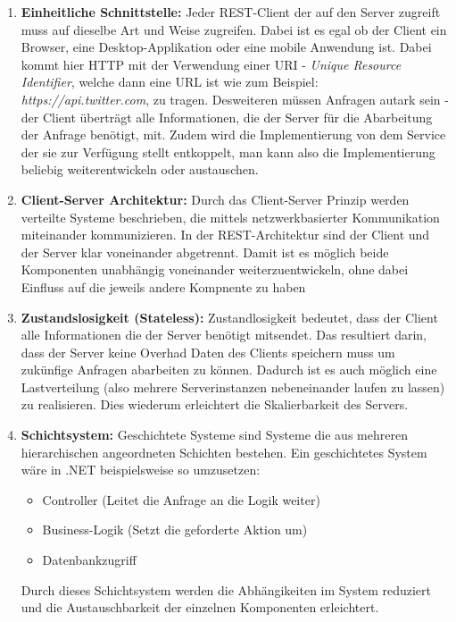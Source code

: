 \begin{enumerate}
    \item \textbf{Einheitliche Schnittstelle: }
    Jeder REST-Client der auf den Server zugreift muss auf dieselbe Art und Weise zugreifen.
    Dabei ist es egal ob der Client ein Browser, eine Desktop-Applikation oder eine mobile Anwendung ist.
    Dabei kommt hier HTTP mit der Verwendung einer URI - \textit{Unique Resource Identifier}, welche dann eine URL ist wie zum Beispiel: \textit{https://api.twitter.com}, zu tragen.
    Desweiteren müssen Anfragen autark sein - der Client überträgt alle Informationen, die der Server für die Abarbeitung der Anfrage benötigt, mit.
    Zudem wird die Implementierung von dem Service der sie zur Verfügung stellt entkoppelt, man kann also die Implementierung beliebig weiterentwickeln oder austauschen.
    \item \textbf{Client-Server Architektur: }
    Durch das Client-Server Prinzip werden verteilte Systeme beschrieben, die mittels netzwerkbasierter Kommunikation miteinander kommunizieren.
    In der REST-Architektur sind der Client und der Server klar voneinander abgetrennt.
    Damit ist es möglich beide Komponenten unabhängig voneinander weiterzuentwickeln, ohne dabei Einfluss auf die jeweils andere Kompnente zu haben
    \item \textbf{Zustandslosigkeit (Stateless): }
    Zustandlosigkeit bedeutet, dass der Client alle Informationen die der Server benötigt mitsendet.
    Das resultiert darin, dass der Server keine Overhad Daten des Clients speichern muss um zukünfige Anfragen abarbeiten zu können.
    Dadurch ist es auch möglich eine Lastverteilung (also mehrere Serverinstanzen nebeneinander laufen zu lassen) zu realisieren. Dies wiederum erleichtert die Skalierbarkeit des Servers.
    \item \textbf{Schichtsystem: }
    Geschichtete Systeme sind Systeme die aus mehreren hierarchischen angeordneten Schichten bestehen. Ein geschichtetes System wäre in .NET beispielsweise so umzusetzen:
    \begin{itemize}
        \item Controller (Leitet die Anfrage an die Logik weiter)
        \item Business-Logik (Setzt die geforderte Aktion um)
        \item Datenbankzugriff
    \end{itemize}
    Durch dieses Schichtsystem werden die Abhängikeiten im System reduziert und die Austauschbarkeit der einzelnen Komponenten erleichtert.

\end{enumerate}
